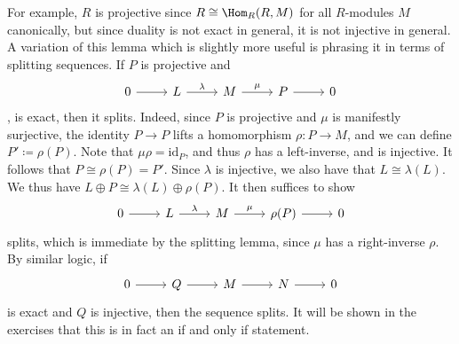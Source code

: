 For example, $R$ is projective since $R\cong \Hom_{R}(R, M) $ for all $R$-modules $M$ canonically, but since duality is not exact in general, it is not injective in general. A variation of this lemma which is slightly more useful is phrasing it in terms of splitting sequences. If $P$ is projective and
\[\begin{tikzcd}[row sep = 2.5em, column sep = 2.5em]
	0\arrow[r]&L\arrow[r, "\lambda "]&M\arrow[r, "\mu "]&P\arrow[r]&0
\end{tikzcd}\], 
is exact, then it splits. Indeed, since $P$ is projective and $\mu $ is manifestly surjective, the identity $P\to P$ lifts a homomorphism $\rho : P\to M$, and we can define $P'\coloneqq \rho (P)$. Note that $\mu \rho =\mathrm{id}_P$, and thus $\rho $ has a left-inverse, and is injective. It follows that $P \cong \rho (P)=P'$. Since $\lambda $ is injective, we also have that $L\cong \lambda (L)$. We thus have $L\oplus P \cong \lambda (L)\oplus \rho (P)$. It then suffices to show
\[\begin{tikzcd}[row sep = 2.5em, column sep = 2.5em]
	0\arrow[r]&L\arrow[r, "\lambda "]&M\arrow[r, "\mu "]&\rho (P)\arrow[r]&0
\end{tikzcd}\]
splits, which is immediate by the splitting lemma, since $\mu $ has a right-inverse $\rho $. By similar logic, if
\[\begin{tikzcd}[row sep = 2.5em, column sep = 2.5em]
	0\arrow[r]&Q\arrow[r]&M\arrow[r]&N\arrow[r]&0
\end{tikzcd}\]
is exact and $Q$ is injective, then the sequence splits. It will be shown in the exercises that this is in fact an if and only if statement.

